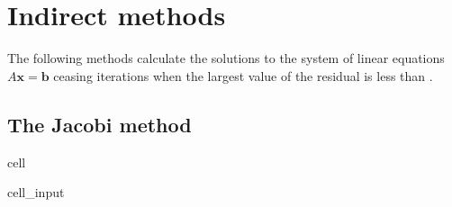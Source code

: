 \documentclass[letterpaper,10pt,english]{jupyterBook}
\begin{document}
\section{Indirect methods}
\label{\detokenize{8_Appendices/8.1_Python:indirect-methods}}
\sphinxAtStartPar
The following methods calculate the solutions to the system of linear equations \(A \mathbf{x} = \mathbf{b}\) ceasing iterations when the largest value of the residual is less than .


\subsection{The Jacobi method}
\label{\detokenize{8_Appendices/8.1_Python:the-jacobi-method}}
\begin{sphinxuseclass}{cell}\begin{sphinxVerbatimInput}

\begin{sphinxuseclass}{cell_input}
\begin{sphinxVerbatim}[commandchars=\\\{\}]
   
      
      
      
       
          
           
              \PYG{p}{[}\PYG{p}{]}
               
                   
                      \PYG{p}{[}\PYG{p}{]}  \PYG{p}{[}\PYG{p}{]}
        
            \PYG{p}{[}\PYG{p}{]}    \PYG{p}{[}\PYG{p}{]}
            
                
           
    
     
\end{sphinxVerbatim}

\end{sphinxuseclass}\end{sphinxVerbatimInput}

\end{sphinxuseclass}
\end{document}
